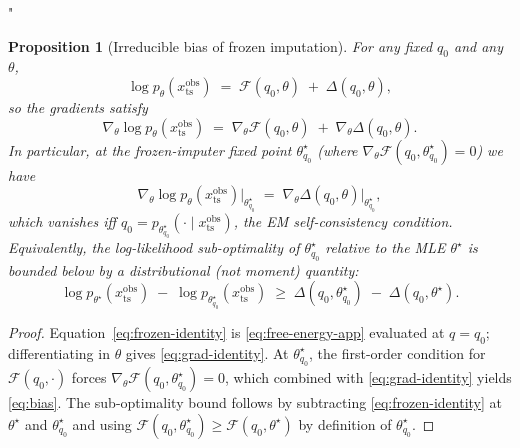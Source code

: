 "\documentclass{article}
\theoremstyle{plain}
\newtheorem{proposition}[theorem]{Proposition}
\theoremstyle{definition}
\theoremstyle{remark}
\newcommand{\xts}{x_{\mathrm{ts}}}
\begin{document}
\begin{proposition}[Irreducible bias of frozen imputation]
\label{prop:frozen-bias}
For any fixed $q_0$ and any $\theta$,
\begin{equation}
\label{eq:frozen-identity}
\log p_\theta(\xts^{\mathrm{obs}}) \;=\; \mathcal{F}(q_0, \theta) \;+\; \Delta(q_0, \theta),
\end{equation}
so the gradients satisfy
\begin{equation}
\label{eq:grad-identity}
\nabla_\theta \log p_\theta(\xts^{\mathrm{obs}}) \;=\; \nabla_\theta \mathcal{F}(q_0, \theta) \;+\; \nabla_\theta \Delta(q_0, \theta).
\end{equation}
In particular, at the frozen-imputer fixed point $\theta^\star_{q_0}$ (where $\nabla_\theta\mathcal{F}(q_0,\theta^\star_{q_0}) = 0$) we have
\begin{equation}
\label{eq:bias}
\nabla_\theta \log p_\theta(\xts^{\mathrm{obs}}) \big|_{\theta^\star_{q_0}} \;=\; \nabla_\theta \Delta(q_0, \theta) \big|_{\theta^\star_{q_0}},
\end{equation}
which vanishes iff $q_0 = p_{\theta^\star_{q_0}}(\cdot\mid\xts^{\mathrm{obs}})$, the EM self-consistency condition. Equivalently, the log-likelihood sub-optimality of $\theta^\star_{q_0}$ relative to the MLE $\theta^\star$ is bounded below by a distributional (not moment) quantity:
\begin{equation}
\log p_{\theta^\star}(\xts^{\mathrm{obs}}) \;-\; \log p_{\theta^\star_{q_0}}(\xts^{\mathrm{obs}}) \;\geq\; \Delta(q_0, \theta^\star_{q_0}) \;-\; \Delta(q_0, \theta^\star).
\end{equation}
\end{proposition}

\begin{proof}
Equation~\eqref{eq:frozen-identity} is \eqref{eq:free-energy-app} evaluated at $q = q_0$; differentiating in $\theta$ gives \eqref{eq:grad-identity}. At $\theta^\star_{q_0}$, the first-order condition for $\mathcal{F}(q_0,\cdot)$ forces $\nabla_\theta\mathcal{F}(q_0,\theta^\star_{q_0}) = 0$, which combined with \eqref{eq:grad-identity} yields \eqref{eq:bias}. The sub-optimality bound follows by subtracting \eqref{eq:frozen-identity} at $\theta^\star$ and $\theta^\star_{q_0}$ and using $\mathcal{F}(q_0,\theta^\star_{q_0}) \geq \mathcal{F}(q_0,\theta^\star)$ by definition of $\theta^\star_{q_0}$.
\end{proof}
\end{document}

